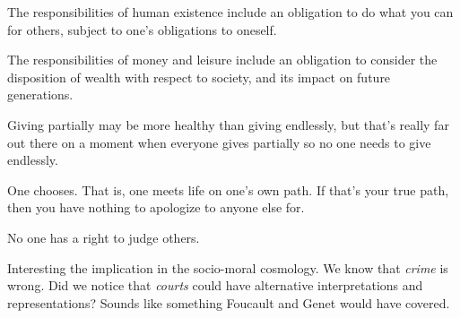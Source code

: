 

The responsibilities of human existence include an obligation to do
what you can for others, subject to one's obligations to oneself.

The responsibilities of money and leisure include an obligation to
consider the disposition of wealth with respect to society, and its
impact on future generations.

Giving partially may be more healthy than giving endlessly, but that's
really far out there on a moment when everyone gives partially so no
one needs to give endlessly.

One chooses.  That is, one meets life on one's own path.  If that's
your true path, then you have nothing to apologize to anyone else for.

No one has a right to judge others.  

Interesting the implication in the socio-moral cosmology.  We know
that {\it crime} is wrong.  Did we notice that {\it courts} could have
alternative interpretations and representations?  Sounds like
something Foucault and Genet would have covered.

\bye
